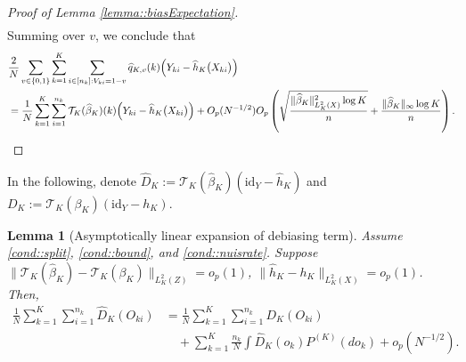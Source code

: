 \documentclass[11pt]{article}
\theoremstyle{plain}
\newtheorem{lemma}{Lemma}
\theoremstyle{definition}
\theoremstyle{remark}
\theoremstyle{definition}
\begin{document}
\begin{proof}[Proof of Lemma \ref{lemma::biasExpectation}]
\begin{align*}
\end{align*} 
Summing over $v$, we conclude that
\begin{align*}
         & \frac{2}{N} \sum_{v \in \{0,1\}} \sum_{k=1}^K \sum_{i \in [n_k]: V_{ki} = 1-v}  \widehat{q}_{K,v}(k) \Bigl(Y_{ki} - \widehat{h}_K\bigl(X_{ki}\bigr)\Bigr)\\
         &=  \frac{1}{N}   \sum_{k=1}^K \sum_{i=1}^{n_k}  \mathcal{T}_{K}(\widehat{\beta}_K)(k) \Bigl(Y_{ki} - \widehat{h}_K\bigl(X_{ki}\bigr)\Bigr) +  O_p(N^{-1/2}) O_p\left( \sqrt{\frac{\|\widehat{\beta}_K\|_{L^2_K(X)}^2 \log K}{n}} + \frac{\|\widehat{\beta}_K\|_{\infty} \log K}{n} \right).
\end{align*} 


 
 

    
\end{proof}


In the following, denote $\widehat{D}_K :=   \mathcal{T}_{K}(\widehat{\beta}_K) (\text{id}_Y - \widehat{h}_K) $ and $D_K := \mathcal{T}_{K}(\beta_{K}) (\text{id}_Y - h_K)$.


\begin{lemma}[Asymptotically linear expansion of debiasing term]
Assume \ref{cond::split}, \ref{cond::bound}, and \ref{cond::nuisrate}. Suppose $\| \mathcal{T}_{K}(\widehat{\beta}_K) -  \mathcal{T}_{K}(\beta_{K})\|_{L^2_K(Z)} = o_p(1)$, $\|\widehat{h}_K - h_K\|_{L^2_K(X)} = o_p(1)$. Then,
  \begin{align*}
      \frac{1}{N}   \sum_{k=1}^K \sum_{i=1}^{n_k} \widehat{D}_K(O_{ki})  &=    \frac{1}{N}   \sum_{k=1}^K \sum_{i=1}^{n_k} D_K(O_{ki}) \\
      & \quad +  \sum_{k=1}^K  \frac{n_k}{N} \int  \widehat{D}_K(o_k)  P^{(K)}(do_k) + o_p(N^{-1/2}) .
  \end{align*}  
\label{lemma::asymlinear}
\end{lemma}
\end{document}
